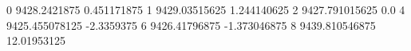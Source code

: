 0 9428.2421875 0.451171875
1 9429.03515625 1.244140625
2 9427.791015625 0.0
4 9425.455078125 -2.3359375
6 9426.41796875 -1.373046875
8 9439.810546875 12.01953125
